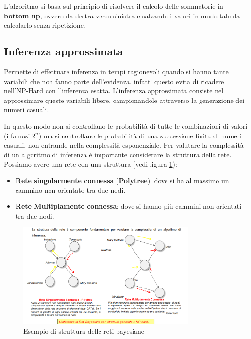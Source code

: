 L'algoritmo si basa sul principio di risolvere il calcolo delle sommatorie in
\textbf{bottom-up}, ovvero da destra verso sinistra e salvando i valori in modo
tale da calcolarlo senza ripetizione.
\subsection{Inferenza approssimata}
Permette di effettuare inferenza in tempi ragionevoli quando si hanno tante
variabili che non fanno parte dell'evidenza, infatti questo evita di ricadere
nell'NP-Hard con l'inferenza esatta. L'inferenza approssimata consiste nel
approssimare queste variabili libere, campionandole attraverso la generazione dei
numeri casuali.

In questo modo non si controllano le probabilità di tutte le combinazioni di valori
(i famosi $2^n$) ma si controllano le probabilità di una successione finita di
numeri casuali, non entrando nella complessità esponenziale.
Per valutare la complessità di un algoritmo di inferenza è importante considerare
la struttura della rete. Possiamo avere una rete con una struttura (vedi figura
\ref{fig:struttura_reti}):
\begin{itemize}
    \item \textbf{Rete singolarmente connessa} (\textbf{Polytree}): dove si ha al
          massimo un cammino non orientato tra due nodi.
    \item \textbf{Rete Multiplamente connessa}: dove si hanno più cammini non
          orientati tra due nodi.
\end{itemize}

\begin{figure}[!h]
    \centering
    \includegraphics[width=0.8\textwidth]{img/Reti/struttura_reti_bayesiane.png}
    \caption{Esempio di struttura delle reti bayesiane}
    \label{fig:struttura_reti}
\end{figure}

